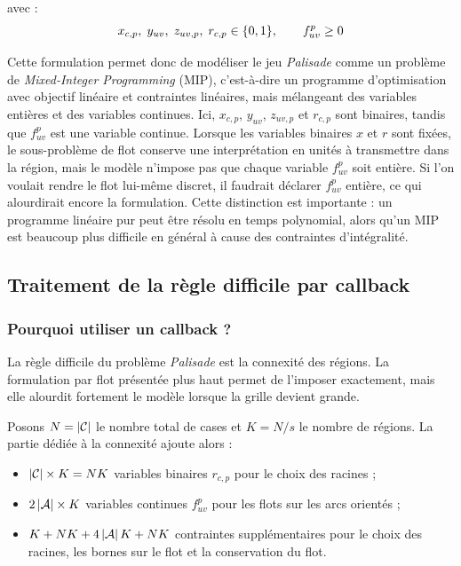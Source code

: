 avec :
\[
x_{c,p},\; y_{uv},\; z_{uv,p},\; r_{c,p} \in \{0,1\},
\qquad
f^{p}_{uv} \geq 0
\]

Cette formulation permet donc de modéliser le jeu \textit{Palisade} comme un problème de \textit{Mixed-Integer Programming} (MIP), c'est-à-dire un programme d'optimisation avec objectif linéaire et contraintes linéaires, mais mélangeant des variables entières et des variables continues. Ici, \(x_{c,p}\), \(y_{uv}\), \(z_{uv,p}\) et \(r_{c,p}\) sont binaires, tandis que \(f^{p}_{uv}\) est une variable continue. Lorsque les variables binaires \(x\) et \(r\) sont fixées, le sous-problème de flot conserve une interprétation en unités à transmettre dans la région, mais le modèle n'impose pas que chaque variable \(f^{p}_{uv}\) soit entière. Si l'on voulait rendre le flot lui-même discret, il faudrait déclarer \(f^{p}_{uv}\) entière, ce qui alourdirait encore la formulation. Cette distinction est importante : un programme linéaire pur peut être résolu en temps polynomial, alors qu'un MIP est beaucoup plus difficile en général à cause des contraintes d'intégralité.

\subsection{Traitement de la règle difficile par callback}

\subsubsection{Pourquoi utiliser un callback ?}

La règle difficile du problème \textit{Palisade} est la connexité des régions. La formulation par flot présentée plus haut permet de l'imposer exactement, mais elle alourdit fortement le modèle lorsque la grille devient grande.

Posons \(N = \left|\mathcal{C}\right|\) le nombre total de cases et \(K = N/s\) le nombre de régions. La partie dédiée à la connexité ajoute alors :
\begin{itemize}
    \item \(\left|\mathcal{C}\right| \times K = NK\) variables binaires \(r_{c,p}\) pour le choix des racines ;
    \item \(2\left|\mathcal{A}\right| \times K\) variables continues \(f^p_{uv}\) pour les flots sur les arcs orientés ;
    \item \(K + NK + 4\left|\mathcal{A}\right|K + NK\) contraintes supplémentaires pour le choix des racines, les bornes sur le flot et la conservation du flot.
\end{itemize}

